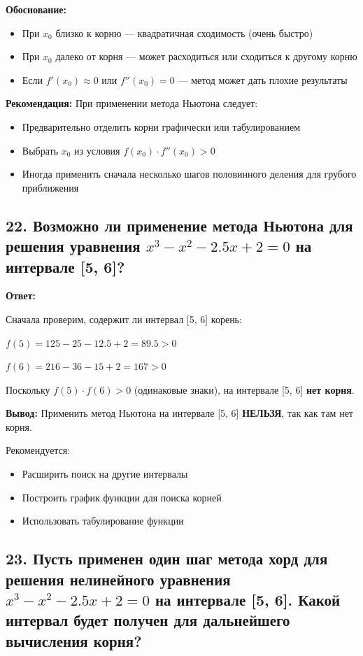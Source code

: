 \documentclass[a4paper,12pt]{article}
\begin{document}
\textbf{Обоснование:}
\begin{itemize}
    \item При $x_0$ близко к корню --- квадратичная сходимость (очень быстро)
    \item При $x_0$ далеко от корня --- может расходиться или сходиться к другому корню
    \item Если $f'(x_0) \approx 0$ или $f''(x_0) = 0$ --- метод может дать плохие результаты
\end{itemize}

\textbf{Рекомендация:} При применении метода Ньютона следует:
\begin{itemize}
    \item Предварительно отделить корни графически или табулированием
    \item Выбрать $x_0$ из условия $f(x_0) \cdot f''(x_0) > 0$
    \item Иногда применить сначала несколько шагов половинного деления для грубого приближения
\end{itemize}

\subsection*{22. Возможно ли применение метода Ньютона для решения уравнения $x^3 - x^2 - 2.5x + 2 = 0$ на интервале [5, 6]?}

\textbf{Ответ:} 

Сначала проверим, содержит ли интервал [5, 6] корень:

$f(5) = 125 - 25 - 12.5 + 2 = 89.5 > 0$

$f(6) = 216 - 36 - 15 + 2 = 167 > 0$

Поскольку $f(5) \cdot f(6) > 0$ (одинаковые знаки), на интервале [5, 6] \textbf{нет корня}.

\textbf{Вывод:} Применить метод Ньютона на интервале [5, 6] \textbf{НЕЛЬЗЯ}, так как там нет корня.

Рекомендуется:
\begin{itemize}
    \item Расширить поиск на другие интервалы
    \item Построить график функции для поиска корней
    \item Использовать табулирование функции
\end{itemize}

\subsection*{23. Пусть применен один шаг метода хорд для решения нелинейного уравнения $x^3 - x^2 - 2.5x + 2 = 0$ на интервале [5, 6]. Какой интервал будет получен для дальнейшего вычисления корня?}
\end{document}
